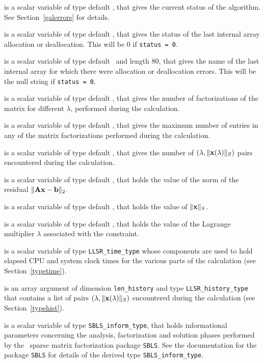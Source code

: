 \documentclass{galahad}
\newcommand{\packagename}{LLSR}
\begin{document}
\begin{description}
 is a scalar variable of type default \integer, that gives the
current status of the algorithm. See Section~\ref{galerrors} for details.

 is a scalar variable of type default \integer,
that gives the status of the last internal array allocation
or deallocation. This will be 0 if {\tt status = 0}.

 is a scalar variable of type default \character\
and length 80, that  gives the name of the last internal array
for which there were allocation or deallocation errors.
This will be the null string if {\tt status = 0}.

 is a scalar variable of type default \integer, that
gives the number of factorizations of the matrix \req{kkt}
for different $\lambda$, performed during the calculation.

 is a scalar variable of type default \integer, that
gives the maximum number of entries in any of the matrix factorizations
performed during the calculation.

 is a scalar variable of type default \integer, that gives
the number of $(\lambda,\|{\mathbf{x}}(\lambda)\|_S)$ pairs encountered during the
calculation.

 is a scalar variable of type default \realdp, that holds the
value of the norm of the residual $\| {\mathbf{A}} {\mathbf{x}} - {\mathbf{b}}\|_2$.

 is a scalar variable of type default \realdp,
that holds the value of $\|{\mathbf{x}}\|_S$.

 is a scalar variable of type default \realdp, that holds the
value of the Lagrange multiplier $\lambda$ associated with the constraint.

 is a scalar variable of type {\tt \packagename\_time\_type}
whose components are used to hold elapsed CPU  and system clock times for the
various parts of the calculation (see Section~\ref{typetime}).

 is an array argument of dimension {\tt len\_history} and
type {\tt \packagename\_history\_type} that contains a list of pairs
$(\lambda,\|{\mathbf{x}}(\lambda)\|_S)$ encountered during the
calculation (see Section~\ref{typehist}).

 is a scalar variable of type {\tt SBLS\_inform\_type},
that holds informational parameters concerning the analysis, factorization
and solution phases performed by
the \galahad\ sparse matrix factorization package {\tt SBLS}.
See the documentation for the package {\tt SBLS} for details of the
derived type {\tt SBLS\_inform\_type}.


\end{description}
\end{document}
